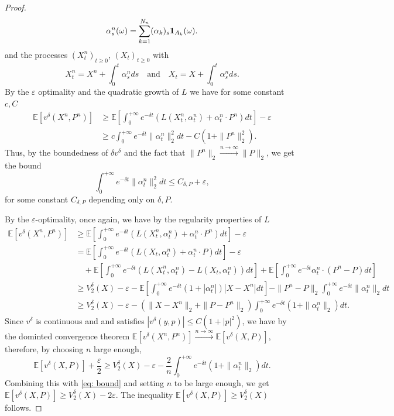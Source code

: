 \documentclass[reqno,11pt]{amsart}
\numberwithin{equation}{section}
\newcommand{\be}{\begin{equation}}
\newcommand{\ee}{\end{equation}}
\newcommand{\e}{\varepsilon}
\newcommand{\nd}{\noindent}
\begin{document}
\begin{proof}
    $$\alpha_s^n(\omega)=\sum_{k=1}^{N_n}(\alpha_k)_s{\bf 1}_{A_k}(\omega).$$
    and the processes $(X_t^n)_{t\ge 0}$, $(X_t)_{t\ge 0}$ with
    $$X_t^n=X^n+\int_0^t\alpha^n_sds\quad\text{and}\quad X_t=X+\int_0^t\alpha^n_s ds.$$
    By the $\e$ optimality and the quadratic growth of $L$ we have for some constant $c,C$
    \begin{align*}
        \mathbb{E}\left[v^\delta(X^n,P^n) \right]&\ge \mathbb{E}\left[\int_0^{+\infty}e^{-\delta t}\left(L(X_t^n,\alpha_t^n)+\alpha_t^n\cdot P^n   \right)dt\right]-\e\\
        &\ge c\int_0^{+\infty}e^{-\delta t}\|\alpha_t^n\|_2^2dt-C(1+\|P^n\|_2^2).
    \end{align*}
    Thus, by the boundedness of $\delta v^\delta$ and the fact that $\|P^n\|_2\xrightarrow{n\to \infty}\|P\|_2$, we get the bound
    \be\label{eq: bound}
        \int_0^{+\infty}e^{-\delta t}\|\alpha_t^n\|_2^2dt\le C_{\delta, P}+\e,
    \ee
    for some constant $C_{\delta,P}$ depending only on $\delta, P$.
    \vspace{1mm}

    \nd
    By the $\e$-optimality, once again, we have by the regularity properties of $L$
    \begin{align*}
        \mathbb{E}\left[v^\delta(X^n,P^n) \right]&\ge \mathbb{E}\left[\int_0^{+\infty}e^{-\delta t}\left(L(X_t^n,\alpha_t^n)+\alpha_t^n\cdot P^n   \right)dt\right]-\e\\
        &= \mathbb{E}\left[\int_0^{+\infty}e^{-\delta t}\left(L(X_t,\alpha_t^n)+\alpha_t^n\cdot P \right)dt\right]-\e\\
        &\quad+\mathbb{E}\left[\int_0^{+\infty}e^{-\delta t}\left(L(X_t^n,\alpha_t^n)-L(X_t,\alpha^n_t) \right)dt\right]+\mathbb{E}\left[\int_0^{+\infty}e^{-\delta t}\alpha_t^n\cdot\left( P^n-P \right)dt\right]\\
        &\ge V_2^\delta(X)-\e-\mathbb{E}\left[\int_0^{+\infty}e^{-\delta t}(1+|\alpha_t^n|)|X-X^n|dt \right]-\|P^n-P\|_2\int_0^{+\infty}e^{-\delta t}\|\alpha_t^n\|_2dt\\
        &\ge V_2^\delta(X)-\e -(\|X-X^n\|_2+\|P-P^n\|_2)\int_0^{+\infty}e^{-\delta t}(1+\|\alpha_t^n\|_2)dt.
    \end{align*}
    Since $v^\delta$ is continuous and  and satisfies $|v^\delta(y,p)|\le C(1+|p|^2)$, we have by the dominted convergence theorem $\mathbb{E}[v^\delta(X^n,P^n)]\xrightarrow{n\to\infty}\mathbb{E}[v^\delta(X,P)]$, therefore, by choosing $n$ large enough,
    $$\mathbb{E}[v^{\delta}(X,P)]+\frac{\e}{2}\ge V_2^\delta(X)-\e-\frac{2}{n}\int_0^{+\infty}e^{-\delta t}(1+\|\alpha_t^n\|_2)dt.$$
    Combining this with \eqref{eq: bound} and setting $n$ to be large enough, we get $\mathbb{E}[v^\delta(X,P)]\ge V_2^\delta(X)-2\e$. The inequality $\mathbb{E}[v^\delta(X,P)]\ge V_2^\delta(X)$ follows.
    \vspace{2mm}


\end{proof}
\end{document}
